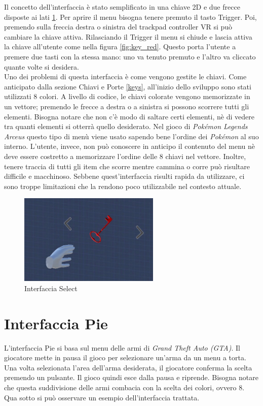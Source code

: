 \documentclass[target=bach,aauheader=]{thud}
\begin{document}
Il concetto dell'interfaccia è stato semplificato in una chiave 2D e due frecce disposte ai lati \ref{fig:select}.
Per aprire il menu bisogna tenere premuto il tasto Trigger.
Poi, premendo sulla freccia destra o sinistra del trackpad controller VR si può cambiare la chiave attiva.
Rilasciando il Trigger il menu si chiude e lascia attiva la chiave all'utente come nella figura \ref{fig:key_red}.
Questo porta l'utente a premere due tasti con la stessa mano: uno va tenuto premuto e l'altro va cliccato quante volte si desidera. \\

Uno dei problemi di questa interfaccia è come vengono gestite le chiavi.
Come anticipato dalla sezione Chiavi e Porte \ref{keys}, all'inizio dello sviluppo sono stati utilizzati 8 colori.
A livello di codice, le chiavi colorate vengono memorizzate in un vettore; premendo le frecce a destra o a sinistra si possono scorrere tutti gli elementi.
Bisogna notare che non c'è modo di saltare certi elementi, nè di vedere tra quanti elementi si otterrà quello desiderato.
Nel gioco di \textit{Pokémon Legends Arceus} questo tipo di menù viene usato sapendo bene l'ordine dei \textit{Pokémon} al suo interno.
L'utente, invece, non può conoscere in anticipo il contenuto del menu nè deve essere costretto a memorizzare l'ordine delle 8 chiavi nel vettore.
Inoltre, tenere traccia di tutti gli item che scorre mentre cammina o corre può risultare difficile e macchinoso.
Sebbene quest'interfaccia risulti rapida da utilizzare, ci sono troppe limitazioni che la rendono poco utilizzabile nel contesto attuale.

\begin{figure}[h]
    \centering
    \includegraphics[width=0.60\textwidth]{select}
    \caption{Interfaccia Select}
    \label{fig:select}
\end{figure}


\section{Interfaccia Pie} %
\label{pie}
L'interfaccia Pie si basa sul menu delle armi di \textit{Grand Theft Auto (GTA)}.
Il giocatore mette in pausa il gioco per selezionare un'arma da un menu a torta.
Una volta selezionata l'area dell'arma desiderata, il giocatore conferma la scelta premendo un pulsante.
Il gioco quindi esce dalla pausa e riprende.
Bisogna notare che questa suddivisione delle armi combacia con la scelta dei colori, ovvero 8. 
Qua sotto si può osservare un esempio dell'interfaccia trattata.
\end{document}
